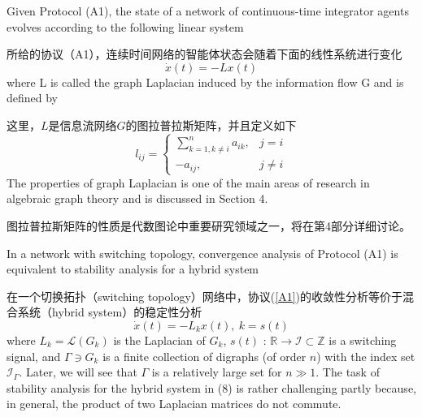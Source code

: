 \documentclass{article}
\begin{document}
{\color[gray]{0.5}
Given Protocol (A1), the state of a network of continuous-time integrator agents evolves according to the following linear system
}

所给的协议（A1），连续时间网络的智能体状态会随着下面的线性系统进行变化
\begin{equation}
    \dot{x}(t) = -Lx(t) 
    \tag{6}
    \label{6}
\end{equation}
{\color[gray]{0.5}
\noindent where L is called the graph Laplacian induced by the information ﬂow G and is deﬁned by
}

\noindent 这里，$L$是信息流网络$G$的图拉普拉斯矩阵，并且定义如下
\begin{equation}
l_{ij} = \left\{
    \begin{array}{ll}
        \sum_{k=1,k\ne i}^n a_{ik}, & j=i\\
        -a_{ij}, & j\ne i
    \end{array}\right.
    \tag{7}
    \label{7}
\end{equation}
{\color[gray]{0.5}
\noindent The properties of graph Laplacian is one of the main areas of research in algebraic graph theory and is discussed in Section 4.
}

\noindent 图拉普拉斯矩阵的性质是代数图论中重要研究领域之一，将在第4部分详细讨论。

{\color[gray]{0.5}
In a network with switching topology, convergence analysis of Protocol (A1) is equivalent to stability analysis for a hybrid system
}

在一个切换拓扑（switching topology）网络中，协议(\ref{A1})的收敛性分析等价于混合系统（hybrid system）的稳定性分析
\begin{equation}
    \dot{x}(t) = -L_kx(t),\ k=s(t) 
    \tag{8}
    \label{8}
\end{equation}
{\color[gray]{0.5}
\noindent where $L_k = \mathcal{L}(G_k)$ is the Laplacian of $G_k$, $s(t)$ : $\mathbb{R}\rightarrow \mathcal{I} \subset \mathbb{Z}$ is a switching signal, and {\color{green}$\Gamma\ni G_k$ is a ﬁnite collection of digraphs (of order $n$) with the index set $\mathcal{I}_\Gamma$}. 
Later, we will see that $\Gamma$ is a relatively large set for $n\gg 1$. 
The task of stability analysis for the hybrid system in (8) is rather challenging partly because, in general, the product of two Laplacian matrices do not commute.
}
\end{document}
